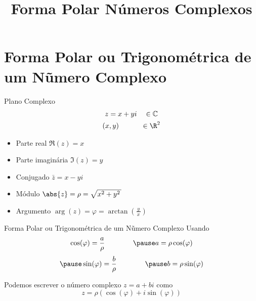 
\usepackage{calculo_varias_variaveis-1}

\title {Forma Polar Números Complexos}



\addtitle

\section{Forma Polar ou Trigonométrica de um Nũmero Complexo}

\begin{frame}[t]{Plano Complexo}
  \begin{gather*}
    z = x + yi \quad          \in \mathbb{C} \\
    (x, y)     \hspace{7.2ex} \in \R^2
  \end{gather*}


  \pause
  \begin{itemize}[<+->]
    \item Parte real       \tabto{32mm} \( \Re(z) = x \)     \\[4mm]
    \item Parte imaginária \tabto{32mm} \( \Im(z) = y \)     \\[4mm]
    \item Conjugado        \tabto{32mm} \( \bar{z} = x - yi \)        \\[4mm]
    \item Módulo           \tabto{32mm} \( \abs{z} = \rho = \sqrt{x^2+y^2\,}\) \\[4mm]
    \item Argumento        \tabto{32mm} \( \arg{(z)} = \varphi = \arctan\left(\frac{\,y\,}{x}\right)\)
  \end{itemize}
\end{frame}

\begin{frame}{Forma Polar ou Trigonométrica de um Nũmero Complexo}
  Usando
  \[
    \cos(\varphi) = \frac{a}{\rho}
    \qquad\qquad
    \pause
    a = \rho\cos(\varphi)
  \]
  \[
    \pause
    \sin(\varphi) = \frac{b}{\rho}
    \qquad\qquad
    \pause
    b = \rho\sin(\varphi)
  \]

  \pause
  \vspace{\baselineskip}
  Podemos escrever o número complexo \(z=a+bi\) como
  \[
    z = \rho \left( \cos(\varphi) + i\sin(\varphi)\right)
  \]
\end{frame}

